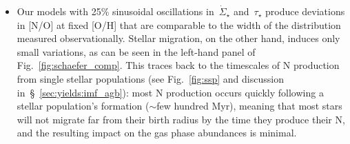 \documentclass[ms.tex]{subfiles}
\begin{document}
\begin{itemize}
	\item Our models with 25\% sinusoidal oscillations in~$\dot{\Sigma}_\star$ 
	and~$\tau_\star$ produce deviations in [N/O] at fixed [O/H] that are 
	comparable to the width of the distribution measured observationally. 
	Stellar migration, on the other hand, induces only small variations, as can 
	be seen in the left-hand panel of Fig.~\ref{fig:schaefer_comp}. 
	This traces back to the timescales of N production from single stellar 
	populations (see Fig.~\ref{fig:ssp} and discussion 
	in~\S~\ref{sec:yields:imf_agb}): most N production occurs quickly 
	following a stellar population's formation ($\sim$few hundred Myr), meaning 
	that most stars will not migrate far from their birth radius by the time 
	they produce their N, and the resulting impact on the gas phase abundances 
	is minimal. 

\end{itemize} 
\end{document}
